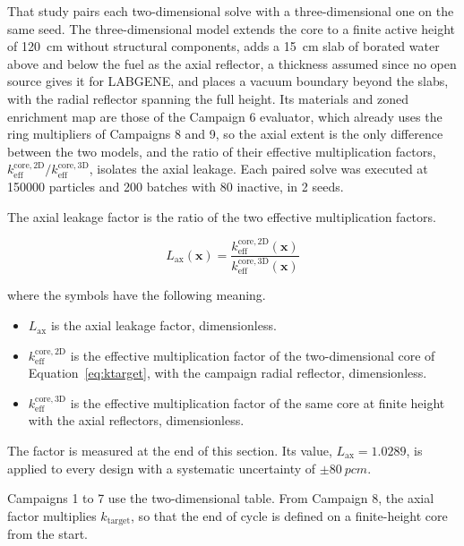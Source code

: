 That study pairs each two-dimensional solve with a three-dimensional
one on the same seed. The three-dimensional model extends the core to a
finite active height of \SI{120}{cm} without structural components, adds
a \SI{15}{cm} slab of borated water above and below the fuel as the
axial reflector, a thickness assumed since no open source gives it for
LABGENE, and places a vacuum boundary beyond the slabs, with the radial reflector spanning the full height. Its
materials and zoned enrichment map are those of the Campaign 6
evaluator, which already uses the ring multipliers of Campaigns 8 and 9,
so the axial
extent is the only difference between the two models, and the ratio of their effective multiplication factors, $k_\mathrm{eff}^\mathrm{core,2D}/k_\mathrm{eff}^\mathrm{core,3D}$, isolates the axial leakage. Each paired
solve was executed at \num{150000} particles and 200 batches with 80 inactive,
in 2 seeds.

The axial leakage factor is the ratio of the two effective multiplication factors.

\begin{equation}
L_\mathrm{ax}(\mathbf{x}) = \frac{k_\mathrm{eff}^\mathrm{core,2D}(\mathbf{x})}{k_\mathrm{eff}^\mathrm{core,3D}(\mathbf{x})}
\label{eq:lax-def}
\end{equation}

\noindent where the symbols have the following meaning.

\begin{itemize}
  \item $L_\mathrm{ax}$ is the axial leakage factor, dimensionless.

  \item $k_\mathrm{eff}^\mathrm{core,2D}$ is the effective
        multiplication factor of the two-dimensional core of
        Equation~\eqref{eq:ktarget}, with the campaign radial reflector,
        dimensionless.

  \item $k_\mathrm{eff}^\mathrm{core,3D}$ is the effective
        multiplication factor of the same core at finite height with the
        axial reflectors, dimensionless.
\end{itemize}

The factor is measured at the end of this section. Its value,
$L_\mathrm{ax} = \num{1.0289}$, is applied to every design with a
systematic uncertainty of $\pm\SI{80}{pcm}$.

Campaigns 1 to 7 use the two-dimensional table. From Campaign 8, the axial factor multiplies $k_\mathrm{target}$, so that the end of cycle is defined on a finite-height core
from the start.

